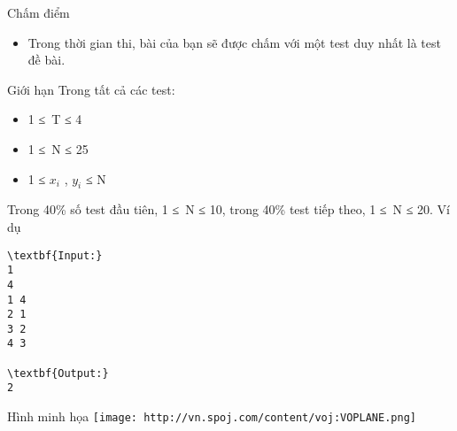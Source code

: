 Chấm điểm
\begin{itemize}
	\item Trong thời gian thi, bài của bạn sẽ được chấm với một test duy nhất là test đề bài.
\end{itemize}
Giới hạn
Trong tất cả các test:
\begin{itemize}
	\item 1 ≤ T ≤ 4
	\item 1 ≤ N ≤ 25
	\item 1 ≤ $x_{i}$ , $y_{i}$ ≤ N
\end{itemize}

Trong 40\% số test đầu tiên, 1 ≤ N ≤ 10, trong 40\% test tiếp theo, 1 ≤ N ≤ 20.
Ví dụ
\begin{verbatim}
\textbf{Input:}
1
4
1 4
2 1
3 2
4 3

\textbf{Output:}
2
\end{verbatim}
Hình minh họa
\texttt{[image: http://vn.spoj.com/content/voj:VOPLANE.png]}
